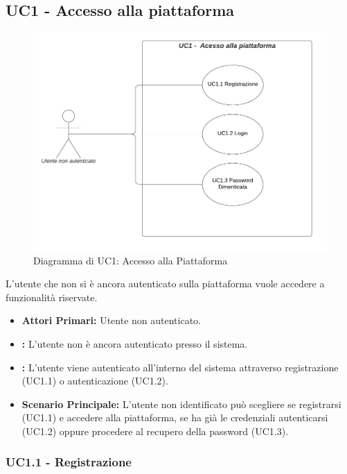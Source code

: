 \subsection{UC1 - Accesso alla piattaforma}\label{UC1}

\begin{figure}[H]
    \centering
    \includegraphics[scale=0.8]{Immagini/DiagrammiUC/UC1AccessoAllaPiattaforma.png}
    \caption{Diagramma di UC1: Accesso alla Piattaforma} 
    \label{fig:AcessoAllaPiattaforma}
\end{figure}

L'utente che non si è ancora autenticato sulla piattaforma vuole accedere a funzionalità riservate.
\begin{itemize}
    \item \textbf{Attori Primari:} Utente non autenticato.
    \item \textbf{:} L'utente non è ancora autenticato presso il sistema.
    \item \textbf{:} L'utente viene autenticato all'interno del sistema attraverso registrazione (UC1.1) o autenticazione (UC1.2).
    \item \textbf{Scenario Principale:} L'utente non identificato può scegliere se registrarsi (UC1.1) e accedere alla piattaforma, se ha già le credenziali autenticarsi (UC1.2) oppure procedere al recupero della password (UC1.3).
\end{itemize}

\subsubsection{UC1.1 - Registrazione}\label{UC1.1}

